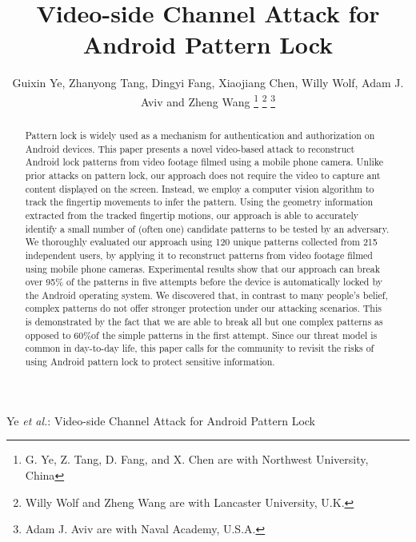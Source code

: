 \documentclass[journal]{IEEEtran}
\begin{document}
\title{Video-side Channel Attack for Android Pattern Lock}


\author{Guixin Ye, Zhanyong Tang, Dingyi Fang, Xiaojiang Chen,
        Willy Wolf, Adam J. Aviv and Zheng Wang
\thanks{G. Ye, Z. Tang, D. Fang, and X. Chen are with Northwest University, China}%
\thanks{Willy Wolf and Zheng Wang are with Lancaster University, U.K.}
\thanks{Adam J. Aviv are with Naval Academy, U.S.A.}}


%
{Ye \MakeLowercase{\textit{et al.}}: Video-side Channel Attack for Android Pattern Lock}

\maketitle

\begin{abstract}
    Pattern lock is widely used as a mechanism for authentication and authorization on Android devices. This paper presents a novel video-based attack to reconstruct Android lock patterns from video footage filmed using a mobile phone camera. Unlike prior attacks on pattern lock, our approach does not require the video to capture ant content displayed on the screen. Instead, we employ a computer vision algorithm to track the fingertip movements to infer the pattern. Using the geometry information extracted from the tracked fingertip motions, our approach is able to accurately identify a small number of (often one) candidate patterns to be tested by an adversary. We thoroughly evaluated our approach using 120 unique patterns collected from 215 independent users, by applying it to reconstruct patterns from video footage filmed using mobile phone cameras. Experimental results show that our approach can break over 95\% of the patterns in five attempts before the device is automatically locked by the Android operating system. We discovered that, in contrast to many people's belief, complex patterns do not offer stronger protection under our attacking scenarios. This is demonstrated by the fact that we are able to break all but one complex patterns as opposed to 60\%of the simple patterns in the first attempt. Since our threat model is common in day-to-day life, this paper calls for the community to revisit the risks of using Android pattern lock to protect sensitive information.
\end{abstract}
\end{document}
